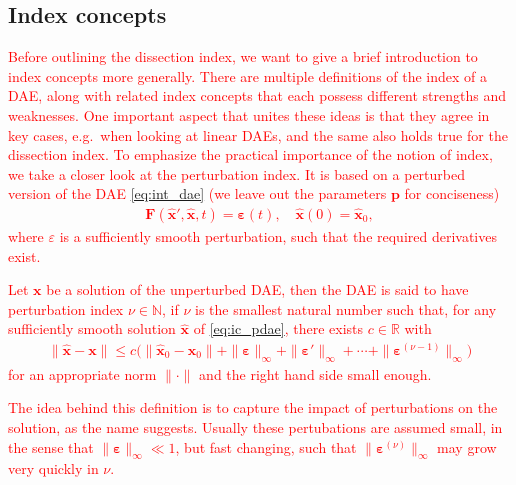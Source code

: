 \documentclass[AMA,STIX1COL]{WileyNJD-v2}
\newcommand{\mb}[1]{\mathbf{#1}}
\newcommand{\mbh}[1]{\hat{\mathbf{#1}}}
\begin{document}
\subsection{Index concepts}
\label{subsec:ic}
\textcolor{red}{Before outlining the dissection index, we want to give a brief introduction to index concepts more generally. There are multiple definitions of the index of a DAE, along with related index concepts that each possess different strengths and weaknesses\cite{mehrmann2015}. One important aspect that unites these ideas is that they agree in key cases, e.g.~when looking at linear DAEs, and the same also holds true for the dissection index. To emphasize the practical importance of the notion of index, we take a closer look at the perturbation index. It is based on a perturbed version of the DAE \eqref{eq:int_dae} (we leave out the parameters $\mb{p}$ for conciseness)
\begin{align}
    \mb{F}(\mbh{x}', \mbh{x}, t) = \boldsymbol{\varepsilon}(t), \quad \mbh{x}(0) = \mbh{x}_0, \label{eq:ic_pdae}
\end{align}
where $\varepsilon$ is a sufficiently smooth perturbation, such that the required derivatives exist.
\begin{definition}
    \label{def:ic_pi}
    Let $\mb{x}$ be a solution of the unperturbed DAE, then the DAE is said to have perturbation index $\nu \in \mathbb{N}$, if $\nu$ is the smallest natural number such that, for any sufficiently smooth solution $\mbh{x}$ of \eqref{eq:ic_pdae}, there exists $c \in \mathbb{R}$ with
    \begin{align*}
        \| \mbh{x} - \mb{x} \| \leq c \big( \| \mbh{x}_0 - \mb{x}_0 \| + \| \boldsymbol{\varepsilon} \|_\infty + \| \boldsymbol{\varepsilon}' \|_\infty + \dotsb + \| \boldsymbol{\varepsilon}^{(\nu - 1)} \|_\infty \big)
    \end{align*}
    for an appropriate norm $\| \cdot \|$ and the right hand side small enough.
\end{definition}
The idea behind this definition is to capture the impact of perturbations on the solution, as the name suggests. Usually these pertubations are assumed small, in the sense that $\| \boldsymbol{\varepsilon} \|_\infty \ll 1$, but fast changing, such that $\| \boldsymbol{\varepsilon}^{(\nu)} \|_\infty$ may grow very quickly in $\nu$.}
\end{document}
